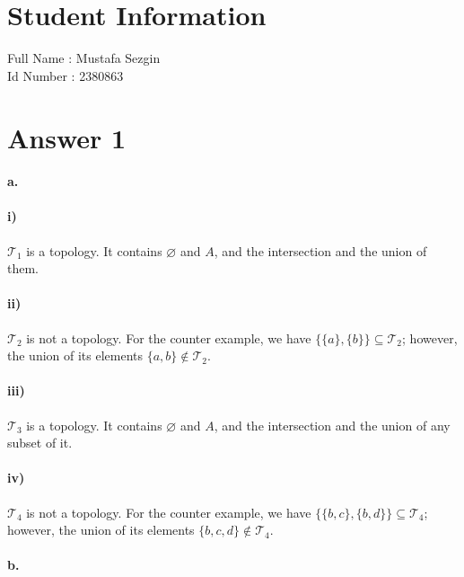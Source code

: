 \documentclass[11pt]{article}
\begin{document}
\section*{Student Information } 
Full Name :  Mustafa Sezgin \\
Id Number :  2380863 \\

\section*{Answer 1}
\paragraph{a.}
\paragraph{i)}
$\mathcal{T}_1$ is a topology. It contains $\varnothing$ and $A$, and the intersection and the union of them.
\paragraph{ii)}
$\mathcal{T}_2$ is not a topology. For the counter example, we have $\{\{a\}, \{b\}\} \subseteq \mathcal{T}_2$; however, the union of its elements $\{a, b\} \notin \mathcal{T}_2$.
\paragraph{iii)}
$\mathcal{T}_3$ is a topology. It contains $\varnothing$ and $A$, and the intersection and the union of any subset of it.
\paragraph{iv)}
$\mathcal{T}_4$ is not a topology. For the counter example, we have $\{\{b, c\}, \{b, d\}\} \subseteq \mathcal{T}_4$; however, the union of its elements $\{b, c, d\} \notin \mathcal{T}_4$.

\newpage
\paragraph{b.}
\end{document}
